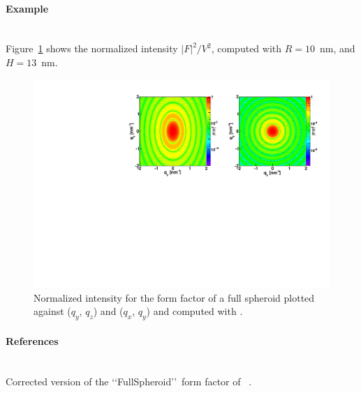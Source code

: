 \paragraph{Example}\strut\\
Figure~\ref{fig:FFfspheroidEx} shows the normalized intensity
$|F|^2/V^2$, computed with $R=10$~nm, and $H=13$~nm.
\begin{figure}[h]
\begin{center}
\includegraphics[angle=-90,width=\textwidth]{fig/ff/figfffspheroid.pdf}
\end{center}
\caption{Normalized intensity for the form factor of a full spheroid plotted against ($q_y$, $q_z$) and ($q_x$, $q_y$) and
  computed with .}
\label{fig:FFfspheroidEx}
\end{figure}

\paragraph{References}\strut\\
Corrected version of the \lq\lq FullSpheroid\rq\rq\ form factor of \IsGISAXS~\cite{Laz02}.



